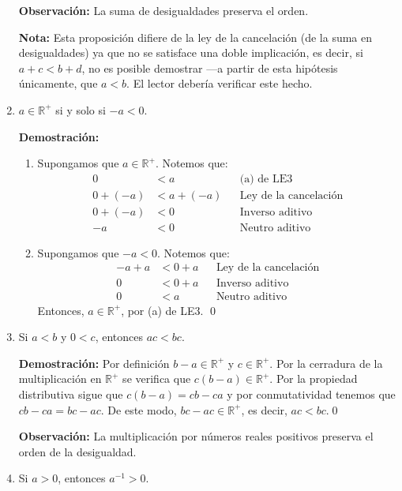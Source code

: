 \documentclass[11pt]{article}
\newcommand{\R}{\mathbb{R}}
\begin{document}
\begin{enumerate}[label=\alph*)]
    \textbf{Observación:} La suma de desigualdades preserva el orden.

    \textbf{Nota:} Esta proposición difiere de la ley de la cancelación (de la suma en desigualdades) ya que no se satisface una doble implicación, es decir, si $a+c<b+d$, no es posible demostrar —a partir de esta hipótesis únicamente, que $a<b$. El lector debería verificar este hecho.%

    \item $a \in \R^+$ si y solo si $-a<0$.
    
    \textbf{Demostración:} \begin{enumerate}[label=\roman*)]
        \item Supongamos que $a \in \R^+$. Notemos que: \begin{align*}
            0 &< a && \text{(a) de LE3}\\
            0 + (-a) &< a + (-a) && \text{Ley de la cancelación}\\
            0 + (-a) &< 0 && \text{Inverso aditivo}\\
            -a &< 0 && \text{Neutro aditivo}
        \end{align*}
        \item Supongamos que $-a<0$. Notemos que:
        \begin{align*}
            -a + a &< 0 + a && \text{Ley de la cancelación}\\
            0 &< 0 + a && \text{Inverso aditivo}\\
            0 &< a && \text{Neutro aditivo}
        \end{align*}Entonces, $a \in \R^+$, por (a) de LE3. \qed
        \end{enumerate}
        
    \item Si $a<b$ y $0<c$, entonces $ac<bc$.
    
    \textbf{Demostración:} Por definición $b-a \in \R^+$ y $c \in \R^+$. Por la cerradura de la multiplicación en $\R^+$ se verifica que $c(b-a) \in \R^+$. Por la propiedad distributiva sigue que $c(b-a)=cb-ca$ y por conmutatividad tenemos que $cb-ca=bc-ac$. De este modo, $bc-ac \in \R^+$, es decir, $ac<bc$.\qed

    \textbf{Observación:} La multiplicación por números reales positivos preserva el orden de la desigualdad.

    \item Si $a>0$, entonces $a^{-1}>0$.
    

\end{enumerate}
\end{document}

